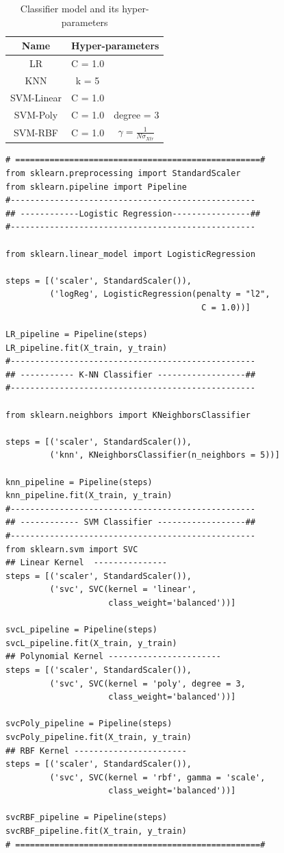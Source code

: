 \begin{table}[!ht]
\centering
\begin{tabular}{|c|c|c| }
  \hline
  Name & \multicolumn{2}{|c|}{Hyper-parameters}\\
  \hline
  LR  & C = 1.0& \\
  \hline
  KNN & k = 5  & \\
  \hline
  SVM-Linear & C = 1.0 &   \\
  \hline
  SVM-Poly &  C = 1.0  &  degree = 3\\
  \hline
  SVM-RBF & C = 1.0    & $\gamma = \frac{1}{N\sigma_{Xtr}}$\\
  \hline
\end{tabular}
\caption{Classifier model and its hyper-parameters}\label{tb:clf_parameters}
\end{table}

\newpage
\begin{lstlisting}
# ==================================================#
from sklearn.preprocessing import StandardScaler
from sklearn.pipeline import Pipeline
#--------------------------------------------------
## ------------Logistic Regression----------------##
#--------------------------------------------------

from sklearn.linear_model import LogisticRegression

steps = [('scaler', StandardScaler()),
         ('logReg', LogisticRegression(penalty = "l2",
                                        C = 1.0))]

LR_pipeline = Pipeline(steps)
LR_pipeline.fit(X_train, y_train)
#--------------------------------------------------
## ----------- K-NN Classifier ------------------##
#--------------------------------------------------

from sklearn.neighbors import KNeighborsClassifier

steps = [('scaler', StandardScaler()),
         ('knn', KNeighborsClassifier(n_neighbors = 5))]

knn_pipeline = Pipeline(steps)
knn_pipeline.fit(X_train, y_train)
#--------------------------------------------------
## ------------ SVM Classifier ------------------##
#--------------------------------------------------
from sklearn.svm import SVC
## Linear Kernel  ---------------
steps = [('scaler', StandardScaler()),
         ('svc', SVC(kernel = 'linear',
                     class_weight='balanced'))]

svcL_pipeline = Pipeline(steps)
svcL_pipeline.fit(X_train, y_train)
## Polynomial Kernel -----------------------
steps = [('scaler', StandardScaler()),
         ('svc', SVC(kernel = 'poly', degree = 3,
                     class_weight='balanced'))]

svcPoly_pipeline = Pipeline(steps)
svcPoly_pipeline.fit(X_train, y_train)
## RBF Kernel -----------------------
steps = [('scaler', StandardScaler()),
         ('svc', SVC(kernel = 'rbf', gamma = 'scale',
                     class_weight='balanced'))]

svcRBF_pipeline = Pipeline(steps)
svcRBF_pipeline.fit(X_train, y_train)
# ==================================================#
\end{lstlisting}

